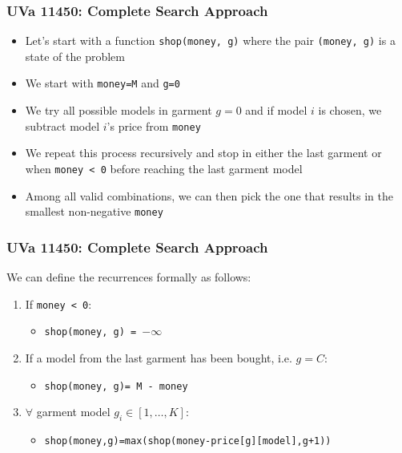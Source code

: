 \documentclass{beamer}
\begin{document}
\begin{frame}[fragile]
\frametitle{UVa 11450: Complete Search Approach}

\begin{itemize}
    \item Let's start with a function \verb|shop(money, g)| where the pair \verb|(money, g)| is a state of the problem
    \pause
    \item We start with \verb|money=M| and \verb|g=0|
    \pause
    \item We try all possible models in garment $g=0$ and if model $i$ is chosen, we subtract model $i$'s price from \verb|money|
    \pause    
    \item We repeat this process recursively and stop in either the last garment or when \verb|money < 0| before reaching the last garment model
    \pause
    \item \color{blue}Among all valid combinations, we can then pick the one that results in the smallest non-negative \verb|money|\color{black}
\end{itemize}

\end{frame}

\begin{frame}[fragile]
\frametitle{UVa 11450: Complete Search Approach}

We can define the recurrences formally as follows:
\begin{enumerate}
    \item If \verb|money < 0|: 
	    \begin{itemize}
        	\item \verb|shop(money, g) = |$-\infty$
    	\end{itemize}
	\pause
    \item If a model from the last garment has been bought, i.e. $g=C$:
	    \begin{itemize}
    	    \item \verb|shop(money, g)= M - money|
	    \end{itemize}
	\pause	    
	\item $\forall$ garment model $g_i \in [1,\ldots,K]$:
		\begin{itemize}
		    \item \verb|shop(money,g)=max(shop(money-price[g][model],g+1))|
		\end{itemize}
\end{enumerate}

\end{frame}
\end{document}
